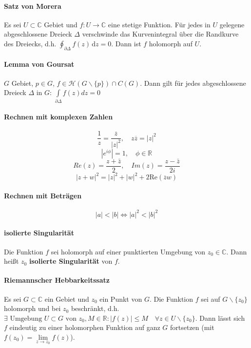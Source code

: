 \documentclass[a4paper, 10pt, DIV20, headings=small]{scrartcl}
\theoremstyle{definition}
\theoremstyle{plain}
\begin{document}
\paragraph{Satz von Morera}
Es sei $U \subset \mathbb{C}$ Gebiet und $f \colon U \rightarrow \mathbb{C}$ eine stetige Funktion. Für jedes in $U$ gelegene abgeschlossene Dreieck $\Delta$ verschwinde das Kurvenintegral über die Randkurve des Dreiecks, d.h. $\oint_{\partial\Delta} f(z)\, \mathrm{d}z = 0$. Dann ist $f$ holomorph auf $U$.

\paragraph{Lemma von Goursat}
$G$ Gebiet, $p \in G$, $f \in \mathcal{H}(G \backslash\{p\}) \cap C(G)$. Dann gilt für jedes abgeschlossene Dreieck $\Delta$ in $G$:
$\int\limits_{\partial \Delta}{f(z)dz} = 0$

\paragraph{Rechnen mit komplexen Zahlen}
$$\frac{1}{z} = \frac{\overline{z}}{|z|^2}, \quad z \overline{z} = |z|^2$$
$$|e^{i \phi}| = 1, \quad \phi \in \mathbb{R}$$
$$Re(z) = \frac{z+\bar{z}}{2}, \quad Im(z) = \frac{z-\bar{z}}{2i}$$
$$|z+w|^2 = |z|^2+|w|^2 + 2 \text{Re}(\overline{z}w)$$

\paragraph{Rechnen mit Beträgen}
$$|a| < |b| \Leftrightarrow |a|^2 < |b|^2$$

\paragraph{isolierte Singularität}
Die Funktion $f$ sei holomorph auf einer punktierten Umgebung von
$z_0 \in \mathbb{C}$. Dann heißt $z_0$ \textbf{isolierte Singularität} von $f$. 

\paragraph{Riemannscher Hebbarkeitssatz}
Es sei $G \subset \mathbb{C}$ ein Gebiet und $z_0$ ein Punkt von $G$. Die Funktion $f$ sei auf $G \backslash \{z_0\}$ holomorph und bei $z_0$ beschränkt, d.h. $\exists \text{ Umgebung } U \subset G \text{ von } z_0, M \in \mathbb{R} \colon |f(z)| \leq M \quad \forall z \in U \backslash \{z_0\}$. Dann lässt sich $f$ eindeutig zu einer holomorphen Funktion auf ganz $G$ fortsetzen (mit $f(z_0) = \lim\limits_{z \rightarrow z_0} f(z)$).
\end{document}
